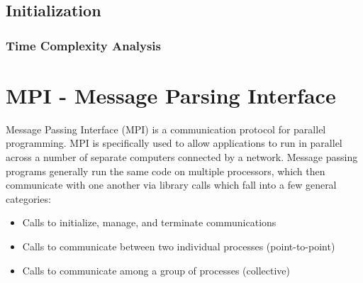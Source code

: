 \documentclass{article}
\newcommand{\cpp}{\lstinline[language=C++]}
\begin{document}
    \subsection{Initialization}
    
    \subsubsection{Time Complexity Analysis}
    
    \clearpage
    \section{MPI - Message Parsing Interface}
    Message Passing Interface (MPI) is a communication protocol for parallel programming. MPI is specifically used to allow applications to run in parallel across a number of separate computers connected by a network.
    Message passing programs generally run the same code on multiple processors, which then communicate with one another via library calls which fall into a few general categories:
        \begin{itemize}
            \item Calls to initialize, manage, and terminate communications
            \item Calls to communicate between two individual processes (point-to-point)
            \item Calls to communicate among a group of processes (collective)
        \end{itemize}
\end{document}
